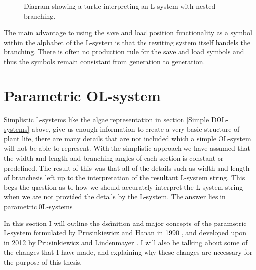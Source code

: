 \begin{flushleft}
\begin{figure}[htbp]
	{\centering
		\setlength{\fboxrule}{1pt}
		\vspace{7px}
		\caption{Diagram showing a turtle interpreting an L-system with nested branching.} \label{branching 2}
	}
\end{figure}
\FloatBarrier

The main advantage to using the save and load position functionality as a symbol within the alphabet of the L-system is that the rewiting system itself handels the branching. There is often no production rule for the save and load symbols and thus the symbols remain consistant from generation to generation. \\ 

\end{flushleft}

\section{Parametric OL-system} \label{parametric}

\begin{flushleft}

Simplistic L-systems like the algae representation in section \ref{Simple DOL-systems} above, give us enough information to create a very basic structure of plant life, there are many details that are not included which a simple OL-system will not be able to represent. With the simplistic approach we have assumed that the width and length and branching angles of each section is constant or predefined. The result of this was that all of the details such as width and length of branchesis left up to the interpretation of the resultant L-system string. This begs the question as to how we should accurately interpret the L-system string when we are not provided the details by the L-system. The answer lies in parametric 0L-systems.

\vspace{5mm}

In this section I will outline the definition and major concepts of the parametric L-system formulated by Prusinkiewicz and Hanan in 1990 \cite{prusinkiewicz1990visualization}, and developed upon in 2012 by Prusinkiewicz and Lindenmayer \cite{prusinkiewicz2012algorithmic}. I will also be talking about some of the changes that I have made, and explaining why these changes are necessary for the purpose of this thesis.

\end{flushleft}

